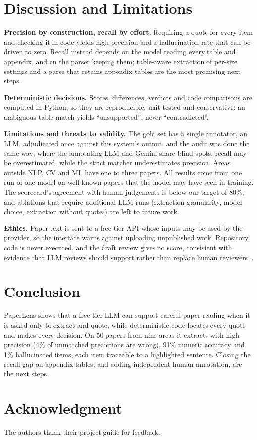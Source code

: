 \documentclass[conference]{IEEEtran}
\begin{document}
\section{Discussion and Limitations}\label{sec:limits}

\textbf{Precision by construction, recall by effort.} Requiring a quote for every item and
checking it in code yields high precision and a hallucination rate that can be driven to
zero. Recall instead depends on the model reading every table and appendix, and on the
parser keeping them; table-aware extraction of per-size settings and a parse that retains
appendix tables are the most promising next steps.

\textbf{Deterministic decisions.} Scores, differences, verdicts and code comparisons are
computed in Python, so they are reproducible, unit-tested and conservative: an ambiguous
table match yields ``unsupported'', never ``contradicted''.

\textbf{Limitations and threats to validity.} The gold set has a single annotator, an LLM,
adjudicated once against this system's output, and the audit was done the same way; where
the annotating LLM and Gemini share blind spots, recall may be overestimated, while the
strict matcher underestimates precision. Areas outside NLP, CV and ML have one to three
papers. All results come from one run of one model on well-known papers that the model
may have seen in training. The scorecard's agreement with human judgements is below our
target of 80\%, and ablations that require additional LLM runs (extraction granularity,
model choice, extraction without quotes) are left to future work.

\textbf{Ethics.} Paper text is sent to a free-tier API whose inputs may be used by the
provider, so the interface warns against uploading unpublished work. Repository code is
never executed, and the draft review gives no score, consistent with evidence that LLM
reviews should support rather than replace human reviewers~\cite{liang2024feedback}.

\section{Conclusion}
PaperLens shows that a free-tier LLM can support careful paper reading when it is asked
only to extract and quote, while deterministic code locates every quote and makes every
decision. On 50 papers from nine areas it extracts with high precision (4\% of unmatched
predictions are wrong), 91\% numeric accuracy and 1\% hallucinated items, each item
traceable to a highlighted sentence. Closing the recall gap on appendix tables, and adding
independent human annotation, are the next steps.

\section*{Acknowledgment}
The authors thank their project guide for feedback.



\end{document}
